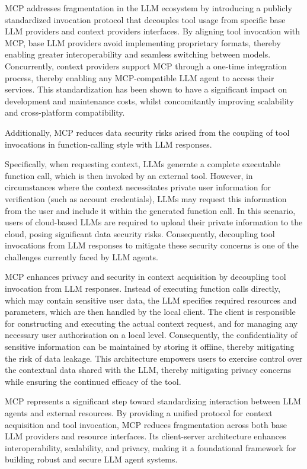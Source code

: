 \documentclass[10pt,preprint]{article}
\begin{document}
MCP addresses fragmentation in the LLM ecosystem by introducing a publicly standardized invocation protocol that decouples tool usage from specific base LLM providers and context providers interfaces. By aligning tool invocation with MCP, base LLM providers avoid implementing proprietary formats, thereby enabling greater interoperability and seamless switching between models. Concurrently, context providers support MCP through a one-time integration process, thereby enabling any MCP-compatible LLM agent to access their services. This standardization has been shown to have a significant impact on development and maintenance costs, whilst concomitantly improving scalability and cross-platform compatibility.

Additionally, MCP reduces data security risks arised from the coupling of tool invocations in function-calling style with LLM responses.

Specifically, when requesting context, LLMs generate a complete executable function call, which is then invoked by an external tool. However, in circumstances where the context necessitates private user information for verification (such as account credentials), LLMs may request this information from the user and include it within the generated function call. In this scenario, users of cloud-based LLMs are required to upload their private information to the cloud, posing significant data security risks. Consequently, decoupling tool invocations from LLM responses to mitigate these security concerns is one of the challenges currently faced by LLM agents.

MCP enhances privacy and security in context acquisition by decoupling tool invocation from LLM responses. Instead of executing function calls directly, which may contain sensitive user data, the LLM specifies required resources and parameters, which are then handled by the local client. The client is responsible for constructing and executing the actual context request, and for managing any necessary user authorisation on a local level. Consequently, the confidentiality of sensitive information can be maintained by storing it offline, thereby mitigating the risk of data leakage. This architecture empowers users to exercise control over the contextual data shared with the LLM, thereby mitigating privacy concerns while ensuring the continued efficacy of the tool.

MCP represents a significant step toward standardizing interaction between LLM agents and external resources. By providing a unified protocol for context acquisition and tool invocation, MCP reduces fragmentation across both base LLM providers and resource interfaces. Its client-server architecture enhances interoperability, scalability, and privacy, making it a foundational framework for building robust and secure LLM agent systems.
\end{document}
